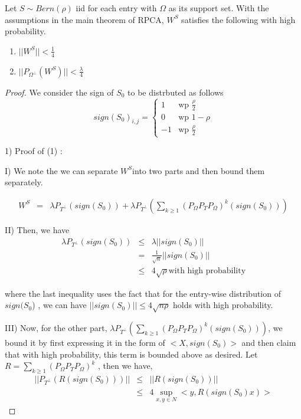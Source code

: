 \documentclass{../common/projectreport}
\begin{document}
\begin{thm}
Let $S\sim Bern(\rho)$ iid for each entry with $\Omega$ as its support set. With the assumptions in the main theorem of RPCA, $W^{S}$ satisfies the following with high probability. 
\begin{enumerate}
\item $||W^{S}||<\frac{1}{4}$ 
\item $||P_{\Omega^{\bot}}(W^{S})||<\frac{\lambda}{4}$ 
\end{enumerate}
\end{thm}
\begin{proof}
We consider the sign of $S_{0}$ to be distrbuted as follows 
\[
sign(S_{0})_{i,j}=\begin{cases}
1 & \text{wp }\frac{\rho}{2}\\
0 & \text{wp }1-\rho\\
-1 & \text{wp }\frac{\rho}{2}
\end{cases}
\]


1) Proof of (1) :

I) We note the we can separate $W^{S}$into two parts and then bound them separately. 

\begin{eqnarray*}
W^{S} & = & \lambda P_{T^{\bot}}(sign(S_{0}))+\lambda P_{T^{\bot}}(\sum_{k\ge1}(P_{\Omega}P_{T}P_{\Omega})^{k}(sign(S_{0})))
\end{eqnarray*}


II) Then, we have 
\begin{eqnarray*}
\lambda P_{T^{\bot}}(sign(S_{0})) & \le & \lambda||sign(S_{0})||\\
 & = & \frac{1}{\sqrt{n}}||sign(S_{0})||\\
 & \le & 4\sqrt{\rho}\text{with high probability}
\end{eqnarray*}


where the last inequality uses the fact that for the entry-wise distribution of $sign(S_{0}$) , we can have $||sign(S_{0})||\le4\sqrt{n\rho}$ holds with high probability. 

III) Now, for the other part, $\lambda P_{T^{\bot}}(\sum_{k\ge1}(P_{\Omega}P_{T}P_{\Omega})^{k}(sign(S_{0})))$, we bound it by first expressing it in the form of $<X,sign(S_{0})>$ and then claim that with high probability, this term is bounded above as desired. Let $R=\sum_{k\ge1}(P_{\Omega}P_{T}P_{\Omega})^{k}$ ,
then we have, 
\begin{eqnarray*}
||P_{T^{\bot}}(R(sign(S_{0})))|| & \le & ||R(sign(S_{0}))||\\
 & \le & 4\sup_{x,y\in N}<y,R(sign(S_{0})x)>
\end{eqnarray*}



\end{proof}
\end{document}
